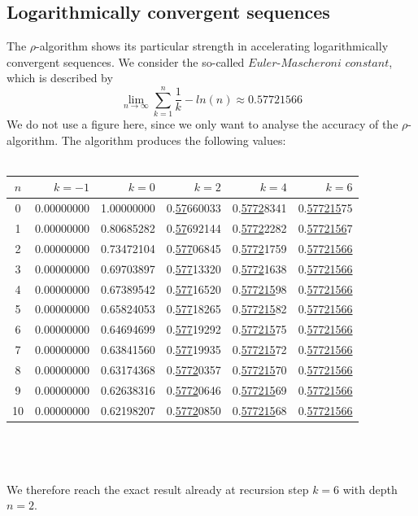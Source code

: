 \documentclass[a4paper,12pt]{article}
\numberwithin{equation}{section}
\theoremstyle{remark}
\begin{document}
\subsection{Logarithmically convergent sequences}\label{subsec:log}
The $\rho$-algorithm shows its particular strength in accelerating logarithmically convergent sequences. We consider the so-called $Euler$-$Mascheroni$ $constant$, which is described by
\[
\lim_{n \to \infty}\sum\limits_{k=1}^{n}\frac{1}{k}-ln(n) \approx0.57721566
\]
We do not use a figure here, since we only want to analyse the accuracy of the $\rho$-algorithm. The algorithm produces the following values:\\\\
\begin{tabular}{c|r|r|r|r|r}
$n$ & $k=-1$ & $k=0$ & $k=2$ & $k=4$ & $k=6$ \\
\hline
0 & 0.00000000 & 1.00000000 & 0.\underline{57}660033 & 0.\underline{5772}8341 & 0.\underline{577215}75 \\
1 & 0.00000000 & 0.80685282 & 0.\underline{57}692144 & 0.\underline{5772}2282 & 0.\underline{5772156}7 \\
2 & 0.00000000 & 0.73472104 & 0.\underline{577}06845 & 0.\underline{5772}1759 & 0.\underline{57721566} \\
3 & 0.00000000 & 0.69703897 & 0.\underline{577}13320 & 0.\underline{5772}1638 & 0.\underline{57721566} \\
4 & 0.00000000 & 0.67389542 & 0.\underline{577}16520 & 0.\underline{577215}98 & 0.\underline{57721566} \\
5 & 0.00000000 & 0.65824053 & 0.\underline{577}18265 & 0.\underline{577215}82 & 0.\underline{57721566} \\
6 & 0.00000000 & 0.64694699 & 0.\underline{577}19292 & 0.\underline{577215}75 & 0.\underline{57721566} \\
7 & 0.00000000 & 0.63841560 & 0.\underline{577}19935 & 0.\underline{577215}72 & 0.\underline{57721566} \\
8 & 0.00000000 & 0.63174368 & 0.\underline{5772}0357 & 0.\underline{577215}70 & 0.\underline{57721566} \\
9 & 0.00000000 & 0.62638316 & 0.\underline{5772}0646 & 0.\underline{577215}69 & 0.\underline{57721566} \\
10 & 0.00000000 & 0.62198207 & 0.\underline{5772}0850 & 0.\underline{577215}68 & 0.\underline{57721566} \\

\end{tabular}\\\\\\
We therefore reach the exact result already at recursion step $k=6$ with depth $n=2$.
\end{document}
